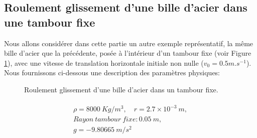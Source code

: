 
\subsection{Roulement glissement d'une bille d'acier dans une tambour fixe}\label{ex2}

Nous allons considérer dans cette partie un autre exemple représentatif, la même bille d'acier que la précédente, posée à l'intérieur d'un tambour fixe (voir Figure \ref{1_ball_drum}), avec une vitesse de translation horizontale initiale non nulle ($ v_0 = 0.5 m.s ^ { -1} $). Nous fournissons ci-dessous une description des paramètres physiques:


\begin{figure}[h!]
	\begin{center}
	\end{center}
	\caption{Roulement glissement d'une bille d'acier dans un tambour fixe.}
	\label{1_ball_drum}
\end{figure}

\begin{eqnarray*}
	\begin{array}{l}
	    \rho=8000\ Kg/m^3, \quad r = 2.7\times10^{-3}\ m,\nonumber\\[2mm]
		Rayon\ tambour\ fixe: 0.05\ m,\nonumber\\[2mm]   
		g = -9.80665\ m/s^2 \nonumber\\[2mm]
	\end{array}
\end{eqnarray*}

